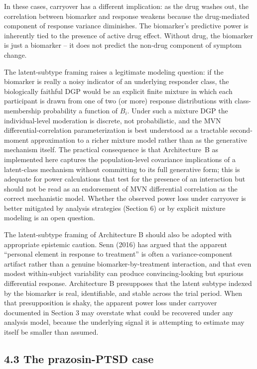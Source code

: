 \documentclass[11pt]{article}
\begin{document}
In these cases, carryover has a different implication: as the
drug washes out, the correlation between biomarker and response
weakens because the drug-mediated component of response variance
diminishes. The biomarker's predictive power is inherently tied
to the presence of active drug effect. Without drug, the
biomarker is just a biomarker -- it does not predict the
non-drug component of symptom change.

The latent-subtype framing raises a legitimate modeling
question: if the biomarker is really a noisy indicator of an
underlying responder class, the biologically faithful DGP would
be an explicit finite mixture in which each participant is drawn
from one of two (or more) response distributions with
class-membership probability a function of $B_i$. Under such a
mixture DGP the individual-level moderation is discrete, not
probabilistic, and the MVN differential-correlation
parameterization is best understood as a tractable
second-moment approximation to a richer mixture model rather
than as the generative mechanism itself. The practical
consequence is that Architecture~B as implemented here captures
the population-level covariance implications of a latent-class
mechanism without committing to its full generative form; this
is adequate for power calculations that test for the presence
of an interaction but should not be read as an endorsement of
MVN differential correlation as the correct mechanistic model.
Whether the observed power loss under carryover is better
mitigated by analysis strategies (Section 6) or by explicit
mixture modeling is an open question.

The latent-subtype framing of Architecture B should also be
adopted with appropriate epistemic caution. Senn (2016) has
argued that
the apparent ``personal element in response to treatment'' is
often a variance-component artifact rather than a genuine
biomarker-by-treatment interaction, and that even modest
within-subject variability can produce convincing-looking but
spurious differential response. Architecture B presupposes that
the latent subtype indexed by the biomarker is real,
identifiable, and stable across the trial period. When that
presupposition is shaky, the apparent power loss under carryover
documented in Section 3 may overstate what could be recovered
under any analysis model, because the underlying signal it is
attempting to estimate may itself be smaller than assumed.

\subsection{4.3 The prazosin-PTSD case}
\end{document}
